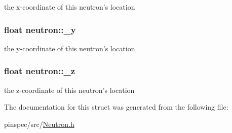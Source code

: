 the x-\/coordinate of this neutron's location \hypertarget{structneutron_a9bc73caa5e8ea77020e7112299deec2e}{
\subsubsection[{\-\_\-y}]{\setlength{\rightskip}{0pt plus 5cm}float neutron\-::\-\_\-y}}\label{structneutron_a9bc73caa5e8ea77020e7112299deec2e}
the y-\/coordinate of this neutron's location \hypertarget{structneutron_a8ee10b15ab1dc8294c84a0d742e15154}{
\subsubsection[{\-\_\-z}]{\setlength{\rightskip}{0pt plus 5cm}float neutron\-::\-\_\-z}}\label{structneutron_a8ee10b15ab1dc8294c84a0d742e15154}
the z-\/coordinate of this neutron's location 

The documentation for this struct was generated from the following file\-:\begin{DoxyCompactItemize}
\item 
pinspec/src/\hyperlink{Neutron_8h}{Neutron.\-h}\end{DoxyCompactItemize}
